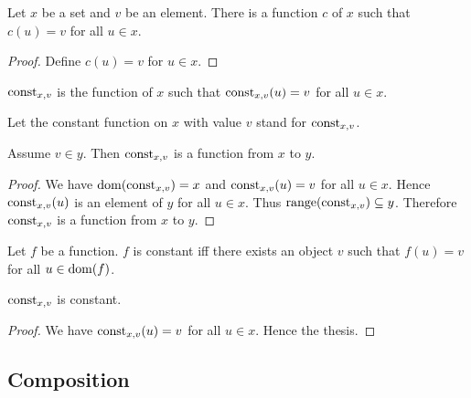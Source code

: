 \documentclass[../../set-theory.ftl.tex]{subfiles}
\begin{document}
  \begin{forthel}
    \begin{lemma}
      Let $x$ be a set and $v$ be an element.
      There is a function $c$ of $x$ such that $c(u) = v$ for all $u \in x$.
    \end{lemma}
    \begin{proof}
      Define $c(u) = v$ for $u \in x$.
    \end{proof}

    \begin{definition}
      $\mbox{const}_{x,v}$ is the function of $x$ such that $\mbox{const}_{x,v}(u) = v$ for all $u \in x$.
    \end{definition}

    Let the constant function on $x$ with value $v$ stand for $\mbox{const}_{x,v}$.

    \begin{proposition}\label{SetTheory_02_01_180417}
      Assume $v \in y$.
      Then $\mbox{const}_{x,v}$ is a function from $x$ to $y$.
    \end{proposition}
    \begin{proof}
      We have $\operatorname{dom}(\mbox{const}_{x,v}) = x$ and $\mbox{const}_{x,v}(u) = v$ for all $u \in x$.
      Hence $\mbox{const}_{x,v}(u)$ is an element of $y$ for all $u \in x$.
      Thus $\operatorname{range}(\mbox{const}_{x,v}) \subseteq y$.
      Therefore $\mbox{const}_{x,v}$ is a function from $x$ to $y$.
    \end{proof}

    \begin{definition}
      Let $f$ be a function.
      $f$ is constant iff there exists an object $v$ such that $f(u) = v$ for all $u \in \operatorname{dom}(f)$.
    \end{definition}

    \begin{proposition}\label{SetTheory_02_01_359618}
      $\mbox{const}_{x,v}$ is constant.
    \end{proposition}
    \begin{proof}
      We have $\mbox{const}_{x,v}(u) = v$ for all $u \in x$.
      Hence the thesis.
    \end{proof}
  \end{forthel}


  \subsection{Composition}
\end{document}

